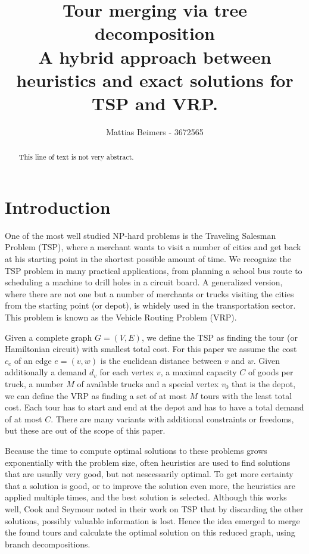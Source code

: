 \documentclass[12pt]{article}
\title{Tour merging via tree decomposition \\ \vspace{2mm} \small{A hybrid approach between
heuristics and exact solutions for TSP and VRP.}}
\author{Mattias Beimers - 3672565}
\begin{document}
\maketitle

%
%
\begin{abstract}
    This line of text is not very abstract.
\end{abstract}



%
%
\section{Introduction}
\label{sec:introduction}
One of the most well studied NP-hard problems is the Traveling Salesman Problem (TSP), where a
merchant wants to visit a number of cities and get back at his starting point in the shortest
possible amount of time.
We recognize the TSP problem in many practical applications, from planning a school bus route to
scheduling a machine to drill holes in a circuit board.
A generalized version, where there are not one but a number of merchants or trucks visiting the
cities from the starting point (or depot), is whidely used in the transportation sector. This
problem is known as the Vehicle Routing Problem (VRP).

Given a complete graph $G = (V, E)$, we define the TSP as finding the tour (or Hamiltonian
circuit) with smallest total cost. For this paper we assume the cost $c_e$ of an edge $e = (v, w)$
is the euclidean distance between $v$ and $w$.
Given additionally a demand $d_v$ for each vertex $v$, a maximal capacity $C$ of goods per truck, a
number $M$ of available trucks and a special vertex $v_0$ that is the depot, we can define the VRP
as finding a set of at most $M$ tours with the least total cost. Each tour has to start and end at
the depot and has to have a total demand of at most $C$.
There are many variants with additional constraints or freedoms, but these are out of the scope of
this paper.

Because the time to compute optimal solutions to these problems grows exponentially with the
problem size, often heuristics are used to find solutions that are usually very good, but not
nescessarily optimal.
To get more certainty that a solution is good, or to improve the solution even more, the heuristics
are applied multiple times, and the best solution is selected. Although this works well, Cook and
Seymour \cite{cook-seymour} noted in their work on TSP that by discarding the other solutions,
possibly valuable information is lost. Hence the idea emerged to merge the found tours and
calculate the optimal solution on this reduced graph, using branch decompositions.
\end{document}
